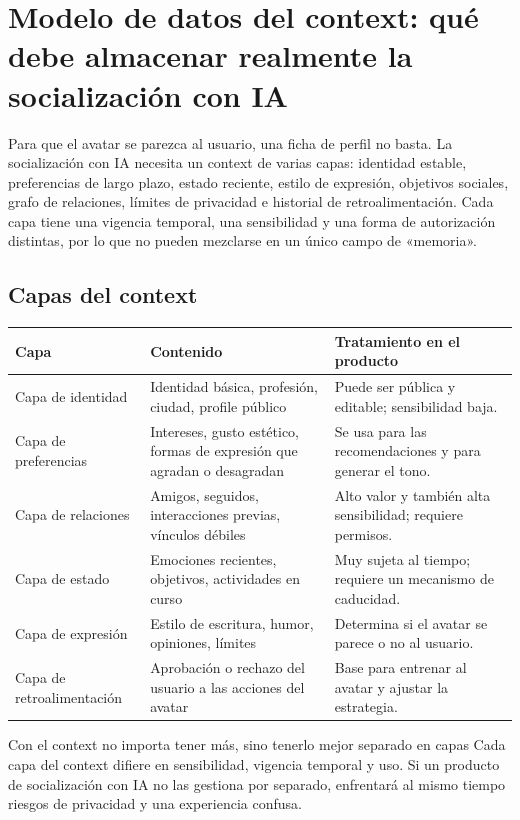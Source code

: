 \section{Modelo de datos del context: qué debe almacenar realmente la socialización con IA}

Para que el avatar se parezca al usuario, una ficha de perfil no basta. La socialización con IA necesita un context de varias capas: identidad estable, preferencias de largo plazo, estado reciente, estilo de expresión, objetivos sociales, grafo de relaciones, límites de privacidad e historial de retroalimentación. Cada capa tiene una vigencia temporal, una sensibilidad y una forma de autorización distintas, por lo que no pueden mezclarse en un único campo de «memoria».

\subsection{Capas del context}

\noindent\begin{longtable}{p{}p{}p{}}
\toprule
Capa & Contenido & Tratamiento en el producto \\
\midrule
Capa de identidad & Identidad básica, profesión, ciudad, profile público & Puede ser pública y editable; sensibilidad baja. \\
Capa de preferencias & Intereses, gusto estético, formas de expresión que agradan o desagradan & Se usa para las recomendaciones y para generar el tono. \\
Capa de relaciones & Amigos, seguidos, interacciones previas, vínculos débiles & Alto valor y también alta sensibilidad; requiere permisos. \\
Capa de estado & Emociones recientes, objetivos, actividades en curso & Muy sujeta al tiempo; requiere un mecanismo de caducidad. \\
Capa de expresión & Estilo de escritura, humor, opiniones, límites & Determina si el avatar se parece o no al usuario. \\
Capa de retroalimentación & Aprobación o rechazo del usuario a las acciones del avatar & Base para entrenar al avatar y ajustar la estrategia. \\
\bottomrule
\end{longtable}

\begin{importantbox}{Con el context no importa tener más, sino tenerlo mejor separado en capas}
Cada capa del context difiere en sensibilidad, vigencia temporal y uso. Si un producto de socialización con IA no las gestiona por separado, enfrentará al mismo tiempo riesgos de privacidad y una experiencia confusa.
\end{importantbox}

